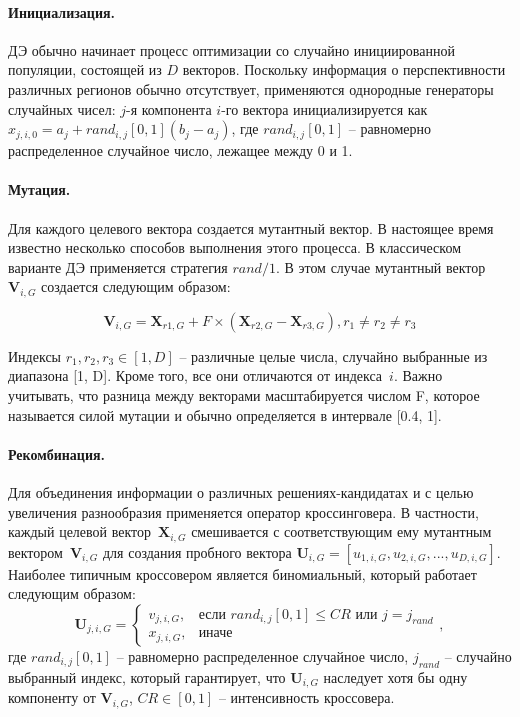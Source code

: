 \paragraph*{Инициализация.}

ДЭ обычно начинает процесс оптимизации со случайно инициированной популяции, состоящей из $D$ векторов. Поскольку информация о перспективности различных регионов обычно отсутствует, применяются однородные генераторы случайных чисел: $j$-я компонента $i$-го вектора инициализируется как $x_{j, i, 0} = a_{j} + rand_{i,j}[0, 1](b_j - a_j )$, где $rand_{i,j} [0, 1]$ -- равномерно распределенное случайное число, лежащее между 0 и 1.

\paragraph*{Мутация.}

Для каждого целевого вектора создается мутантный вектор. В настоящее время известно несколько способов выполнения этого процесса. В классическом варианте ДЭ применяется стратегия $rand/1$. В этом случае мутантный вектор $\textbf{V}_{i,G}$ создается следующим образом:

\begin{equation}\label{eq:de_mut}
  \textbf{V}_{i,G} = \textbf{X}_{r1,G} + F \times (\textbf{X}_{r2,G} - \textbf{X}_{r3,G}), r_1 \neq r_2 \neq r_3
\end{equation}

Индексы $r_1, r_2, r_3 \in [1, D]$ -- различные целые числа, случайно выбранные из диапазона [1, D]. Кроме того, все они отличаются от индекса~$i$. Важно учитывать, что разница между векторами масштабируется числом F, которое называется силой мутации и обычно определяется в интервале [0.4, 1].

\paragraph*{Рекомбинация.}

Для объединения информации о различных решениях-кандидатах и с целью увеличения разнообразия применяется оператор кроссинговера. В частности, каждый целевой вектор~$\textbf{X}_{i,G}$ смешивается с соответствующим ему мутантным вектором~$\textbf{V}_{i,G}$ для создания пробного вектора $\textbf{U}_{i,G} = [u_{1,i,G}, u_{2,i,G}, ..., u_{D,i,G}]$. Наиболее типичным кроссовером является биномиальный, который работает следующим образом:
\begin{equation}\label{eq:de_crossover}
  \textbf{U}_{j,i,G} =
    \begin{cases}
     v_{j,i,G}, & \mbox{если~} rand_{i,j}[0, 1] \leq CR \mbox{~или~} j = j_{rand} \\
     x_{j,i,G}, & \mbox{иначе}
    \end{cases},
\end{equation}
где $rand_{i,j}[0, 1]$ -- равномерно распределенное случайное число, $j_{rand}$ -- случайно выбранный индекс, который гарантирует, что $\textbf{U}_{i,G}$ наследует хотя бы одну компоненту от $\textbf{V}_{i,G}$, $CR \in [0, 1]$ -- интенсивность кроссовера.


